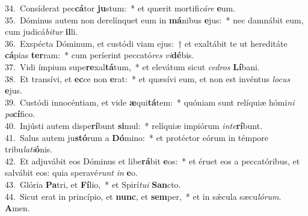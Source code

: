 {34.~}Consíderat pec\textbf{cá}tor \textbf{ju}stum:~* et quærit mortifi\textit{cá}\textit{re} \textbf{e}um.\\
{35.~}Dóminus autem non derelínquet eum in \textbf{má}nibus \textbf{e}jus:~* nec damnábit eum, cum judicá\textit{bi}\textit{tur} \textbf{il}li.\\
{36.~}Exspécta Dóminum, et custódi viam ejus:~† et exaltábit te ut hereditáte \textbf{cá}pias \textbf{ter}ram:~* cum períerint peccató\textit{res} \textit{vi}\textbf{dé}bis.\\
{37.~}Vidi ímpium supe\textbf{re}xal\textbf{tá}tum,~* et elevátum sicut \textit{ce}\textit{dros} \textbf{Lí}bani.\\
{38.~}Et transívi, et \textbf{ec}ce non \textbf{e}rat:~* et quæsívi eum, et non est invéntus \textit{lo}\textit{cus} \textbf{e}jus.\\
{39.~}Custódi innocéntiam, et vide \textbf{æ}qui\textbf{tá}tem:~* quóniam sunt relíquiæ hómi\textit{ni} \textit{pa}\textbf{cí}fico.\\
{40.~}Injústi autem dispe\textbf{rí}bunt \textbf{si}mul:~* relíquiæ impiórum \textit{in}\textit{te}\textbf{rí}bunt.\\
{41.~}Salus autem ju\textbf{stó}rum a \textbf{Dó}mino:~* et protéctor eórum in témpore tribu\textit{la}\textit{ti}\textbf{ó}nis.\\
{42.~}Et adjuvábit eos Dóminus et libe\textbf{rá}bit \textbf{e}os:~* et éruet eos a peccatóribus, et salvábit eos: quia speravé\textit{runt} \textit{in} \textbf{e}o.\\
{43.~}Glória \textbf{Pa}tri, et \textbf{Fí}lio,~* et Spirí\textit{tu}\textit{i} \textbf{San}cto.\\
{44.~}Sicut erat in princípio, et \textbf{nunc}, et \textbf{sem}per,~* et in sǽcula sæcu\textit{ló}\textit{rum}. \textbf{A}men.\\
